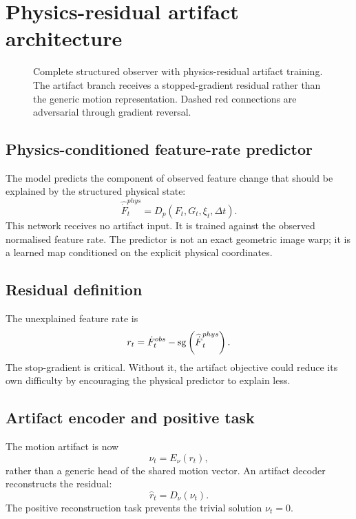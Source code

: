 \documentclass[11pt,a4paper]{article}
\begin{document}
\section{Physics-residual artifact architecture}
\begin{figure}\centering\caption{Complete structured observer with physics-residual artifact training. The artifact branch receives a stopped-gradient residual rather than the generic motion representation. Dashed red connections are adversarial through gradient reversal.}\label{fig:architecture}\end{figure}\clearpage

\subsection{Physics-conditioned feature-rate predictor}
The model predicts the component of observed feature change that should be explained by the structured physical state:
\begin{equation}
\widehat{\dot F}^{phys}_t=D_p(F_t,G_t,\xi_t,\Delta t).
\end{equation}
This network receives no artifact input. It is trained against the observed normalised feature rate. The predictor is not an exact geometric image warp; it is a learned map conditioned on the explicit physical coordinates.

\subsection{Residual definition}
The unexplained feature rate is
\begin{equation}
r_t=\dot F_t^{obs}-\operatorname{sg}\left(\widehat{\dot F}^{phys}_t\right).
\end{equation}
The stop-gradient is critical. Without it, the artifact objective could reduce its own difficulty by encouraging the physical predictor to explain less.

\subsection{Artifact encoder and positive task}
The motion artifact is now
\begin{equation}
\nu_t=E_\nu(r_t),
\end{equation}
rather than a generic head of the shared motion vector. An artifact decoder reconstructs the residual:
\begin{equation}
\hat r_t=D_\nu(\nu_t).
\end{equation}
The positive reconstruction task prevents the trivial solution $\nu_t=0$.
\end{document}
